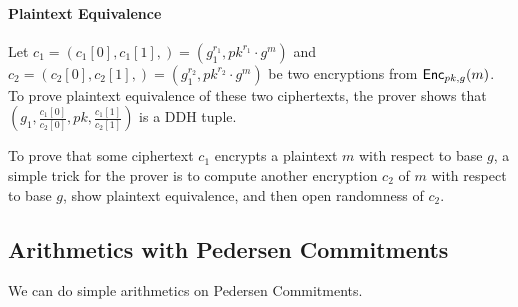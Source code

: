 \paragraph{Plaintext Equivalence}
Let $c_1=(c_1[0],c_1[1],)=(g_1^{r_1},pk^{r_1}\cdot{}g^m)$ and
$c_2=(c_2[0],c_2[1],)=(g_1^{r_2},pk^{r_2}\cdot{}g^m)$ be two
encryptions from ${\mathsf{Enc}}_{pk,g}(m)$. To prove plaintext equivalence of
these two ciphertexts, the prover shows that
$(g_1,\frac{c_1[0]}{c_2[0]},pk,\frac{c_1[1]}{c_2[1]})$ is a DDH tuple.

To prove that some ciphertext $c_1$ encrypts a plaintext $m$ with
respect to base $g$, a simple trick for the prover is to compute
another encryption $c_2$ of $m$ with respect to base $g$, show
plaintext equivalence, and then open randomness of $c_2$.

\subsection{Arithmetics with Pedersen Commitments}
We can do simple arithmetics on Pedersen Commitments.
